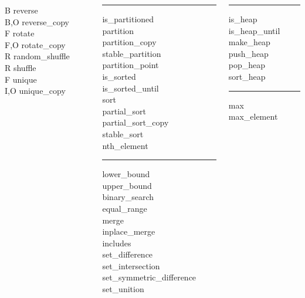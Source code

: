 \documentclass{beamer}
\begin{document}
{\begin{columns}[T]
\begin{column}{0.2\textwidth}
      B reverse \\
      B,O reverse\_copy \\
      F rotate \\
      F,O rotate\_copy \\
      R random\_shuffle \\
      R shuffle \\
      F unique \\
      I,O unique\_copy
   \end{column}
   \begin{column}{0.3\textwidth}
     \hrule
     is\_partitioned \\
     partition \\
     partition\_copy \\
     stable\_partition \\
     partition\_point \\
     is\_sorted \\
     is\_sorted\_until \\
     sort \\
     partial\_sort \\
     partial\_sort\_copy \\
     stable\_sort \\
     nth\_element \\
     \hrule
     lower\_bound \\
     upper\_bound \\
     binary\_search \\
     equal\_range \\
     merge \\
     inplace\_merge \\
     includes \\
     set\_difference \\
     set\_intersection \\
     set\_symmetric\_difference \\
     set\_unition 
   \end{column}
   \begin{column}{0.3\textwidth}
     \hrule
     is\_heap \\
     is\_heap\_until \\
     make\_heap \\
     push\_heap \\
     pop\_heap \\
     sort\_heap \\
     \hrule
     max \\
     max\_element \\

\end{column}
\end{columns}}
\end{document}
